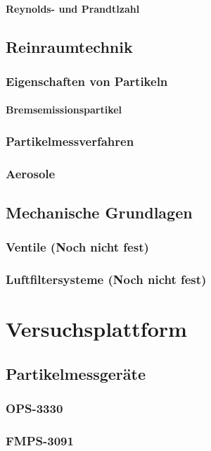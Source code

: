 \subsubsection{Reynolds- und Prandtlzahl}

\section{Reinraumtechnik}
\subsection{Eigenschaften von Partikeln}
\subsubsection{Bremsemissionspartikel}
\subsection{Partikelmessverfahren}
\subsection{Aerosole}

\section{Mechanische Grundlagen}
\subsection{Ventile (Noch nicht fest)}
\subsection{Luftfiltersysteme (Noch nicht fest)}


\chapter{Versuchsplattform}\label{ch:platform}
\section{Partikelmessger\"{a}te}
\subsection{OPS-3330}
\subsection{FMPS-3091}

